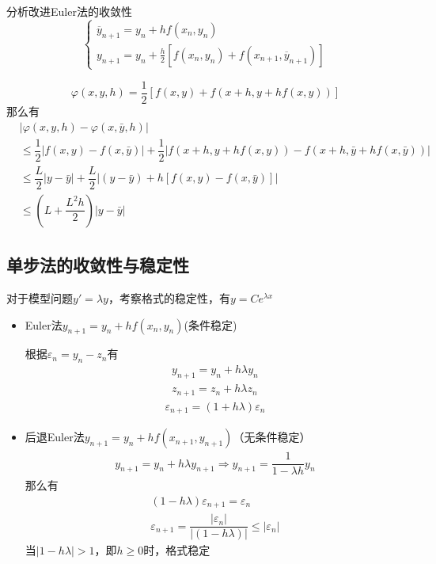 \begin{example}
    分析改进Euler法的收敛性
    \[
        \begin{cases}
            \overline{y}_{n+1}=y_n+hf(x_n,y_n)\\
            y_{n+1}=y_n+\frac{h}{2}[f(x_n,y_n)+f(x_{n+1},\overline{y}_{n+1})]
        \end{cases}
    \]
    \begin{solution}
        \[
            \varphi(x,y,h) = \dfrac{1}{2}\left[ f(x,y)+f(x+h,y+hf(x,y)) \right]
        \]
        那么有
        \[
            \begin{aligned}
                & |\varphi(x,y,h) -\varphi(x,\bar{y},h) |\\
                & \leqslant \dfrac{1}{2}|f(x,y)-f(x,\bar{y})| + \dfrac{1}{2}\left|f(x+h,y+hf(x,y))-f(x+h,\bar{y}+hf(x,\bar{y}))\right|\\
                &\leqslant \dfrac{L}{2}\left|y-\bar{y}\right|+\dfrac{L}{2}|(y-\bar{y})+h\left[ f(x,y)-f(x,\bar{y}) \right]|\\
                &\leqslant (L+\dfrac{L^2h}{2})|y-\bar{y}|
            \end{aligned}
        \]
    \end{solution}
\end{example}
\subsection{单步法的收敛性与稳定性}
对于模型问题$y' =\lambda y$，考察格式的稳定性，有$y = Ce^{\lambda x}$
\begin{itemize}
    \item Euler法$y_{n+1}=y_n+hf(x_n,y_n)$(\colorbox{red!50}{条件稳定})
    
    根据$\varepsilon_n = y_n-z_n$有
    \[
        \begin{array}{l}
            y_{n+1} = y_n + h\lambda y_n\\
            z_{n+1} = z_n + h\lambda z_n
        \end{array}
    \]
    \[
        \begin{aligned}
            \varepsilon_{n+1}=(1+h\lambda)\varepsilon_n
        \end{aligned}
    \]
    \item 后退Euler法$y_{n+1}=y_n+hf(x_{n+1},y_{n+1})$（\colorbox{cyan!50}{无条件稳定}）
    \[
        \begin{aligned}
            y_{n+1} = y_n+h\lambda y_{n+1}\Rightarrow  y_{n+1} =\dfrac{1}{1-\lambda h}y_n
        \end{aligned}
    \]
    那么有
    \[
        \begin{array}{l}
            (1-h\lambda)\varepsilon_{n+1}=\varepsilon_n\\
            \varepsilon_{n+1} = \dfrac{|\varepsilon_n|}{| (1-h\lambda)|}\leqslant |\varepsilon_n|
        \end{array}
    \]
    当$|1 - h\lambda |> 1$，即$h \geqslant 0$时，格式稳定
\end{itemize}
